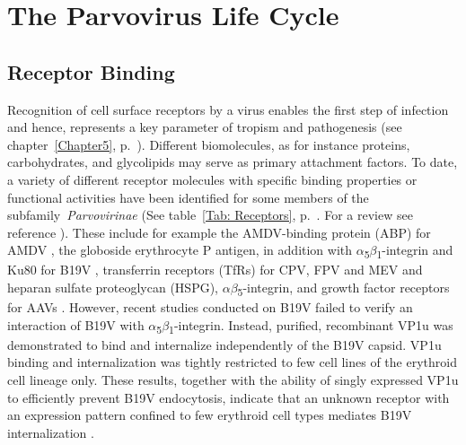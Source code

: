 
\chapter{The Parvovirus Life Cycle} %

\label{Chapter7} %


\section{Receptor Binding}
\label{Binding}
Recognition of cell surface receptors by a virus enables the first step of infection and hence, represents a key parameter of tropism and pathogenesis (see chapter~\ref{Chapter5}, p.~\pageref{Chapter5}). Different biomolecules, as for instance proteins, carbohydrates, and glycolipids may serve as primary attachment factors. To date, a variety of different receptor molecules with specific binding properties or functional activities have been identified for some members of the subfamily~\textit{Parvovirinae} (See table~\ref{Tab: Receptors}, p.~\pageref{Tab: Receptors}. For a review see reference \cite{Receptor}). These include for example the AMDV-binding protein (ABP) for AMDV \cite{pmid10196278}, the globoside erythrocyte P antigen, in addition with $\alpha$\textsubscript{5}$\beta$\textsubscript{1}-integrin and Ku80 for B19V \cite{pmid8211117, pmid15661151, pmid12907437, pmid16076874, weigel}, transferrin receptors (TfRs) for CPV, FPV and MEV \cite{pmid16040076, pmid11264378} and heparan sulfate proteoglycan (HSPG), $\alpha$\textsubscript{}$\beta$\textsubscript{5}-integrin, and growth factor receptors for AAVs \cite{pmid14502277, pmid15596854, pmid9883842, pmid9445046, pmid9883843, pmid8599196}. However, recent studies conducted on B19V failed to verify an interaction of B19V with $\alpha$\textsubscript{5}$\beta$\textsubscript{1}-integrin. Instead, purified, recombinant VP1u was demonstrated to bind and internalize independently of the B19V capsid. VP1u binding and internalization was tightly restricted to few cell lines of the erythroid cell lineage only. These results, together with the ability of singly expressed VP1u to efficiently prevent B19V endocytosis, indicate that an unknown receptor with an expression pattern confined to few erythroid cell types mediates B19V internalization \cite{pmid24067971}.  


